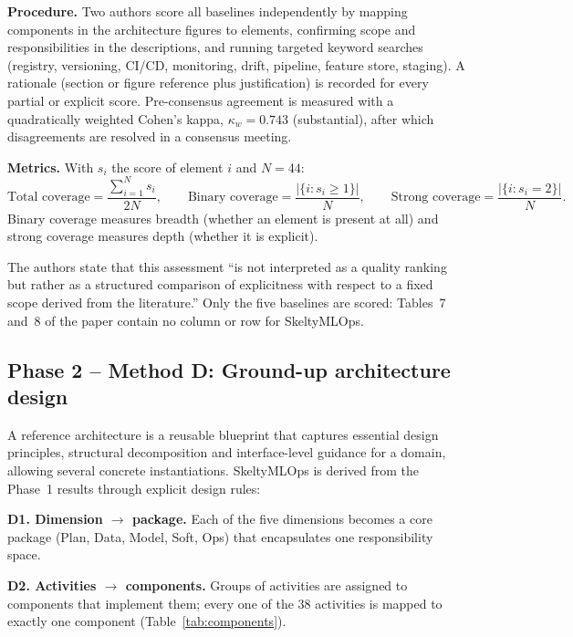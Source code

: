 \documentclass[11pt,a4paper]{article}
\begin{document}
\textbf{Procedure.}
Two authors score all baselines independently by mapping components in the architecture figures to elements, confirming scope and responsibilities in the descriptions, and running targeted keyword searches (registry, versioning, CI/CD, monitoring, drift, pipeline, feature store, staging). A rationale (section or figure reference plus justification) is recorded for every partial or explicit score. Pre-consensus agreement is measured with a quadratically weighted Cohen's kappa, $\kappa_w = 0.743$ (substantial), after which disagreements are resolved in a consensus meeting.

\textbf{Metrics.}
With $s_i$ the score of element $i$ and $N = 44$:
\[
\text{Total coverage} = \frac{\sum_{i=1}^{N} s_i}{2N}, \qquad
\text{Binary coverage} = \frac{|\{i : s_i \geq 1\}|}{N}, \qquad
\text{Strong coverage} = \frac{|\{i : s_i = 2\}|}{N}.
\]
Binary coverage measures breadth (whether an element is present at all) and strong coverage measures depth (whether it is explicit).

\begin{callout}
The authors state that this assessment ``is not interpreted as a quality ranking but rather as a structured comparison of explicitness with respect to a fixed scope derived from the literature.'' Only the five baselines are scored: Tables~7 and~8 of the paper contain no column or row for SkeltyMLOps.
\end{callout}

\subsection{Phase 2 -- Method D: Ground-up architecture design}

A reference architecture is a reusable blueprint that captures essential design principles, structural decomposition and interface-level guidance for a domain, allowing several concrete instantiations. SkeltyMLOps is derived from the Phase~1 results through explicit design rules:

\textbf{D1. Dimension $\rightarrow$ package.} Each of the five dimensions becomes a core package (Plan, Data, Model, Soft, Ops) that encapsulates one responsibility space.

\textbf{D2. Activities $\rightarrow$ components.} Groups of activities are assigned to components that implement them; every one of the 38 activities is mapped to exactly one component (Table~\ref{tab:components}).
\end{document}
